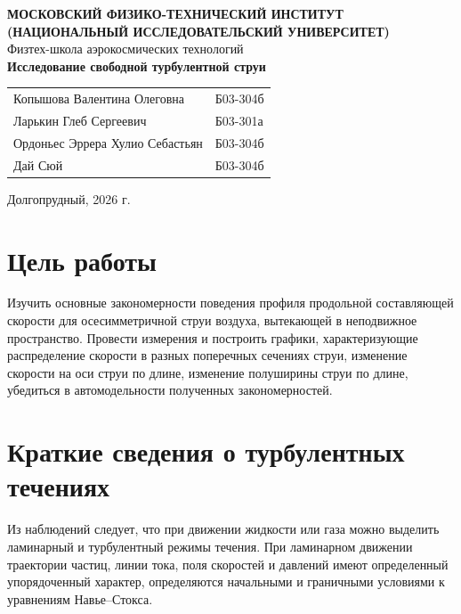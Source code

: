 \documentclass[12pt,a4paper]{article}
\begin{document}
\begin{titlepage}
    \begin{center}
        \textbf{МОСКОВСКИЙ ФИЗИКО-ТЕХНИЧЕСКИЙ ИНСТИТУТ} \\
        \textbf{(НАЦИОНАЛЬНЫЙ ИССЛЕДОВАТЕЛЬСКИЙ УНИВЕРСИТЕТ)}
        \\[1cm]

        
        {\large Физтех-школа аэрокосмических технологий}
        \\[3.5cm]

        {\Huge \textbf{Исследование свободной турбулентной струи}}
        \\[0.5cm]

        \begin{flushright}
            \begin{tabular}{l l}
                Копышова Валентина Олеговна & Б03-304б \\
                Ларькин Глеб Сергеевич & Б03-301а \\
                Ордоньес Эррера Хулио Себастьян & Б03-304б \\
                Дай Сюй                  & Б03-304б \\
            \end{tabular}
        \end{flushright}

        \vfill

        {\large Долгопрудный, 2026 г.}
    \end{center}
\end{titlepage}

\tableofcontents
\newpage

\section{Цель работы}
Изучить основные закономерности поведения профиля продольной составляющей скорости для осесимметричной струи воздуха, вытекающей в неподвижное пространство. Провести измерения и построить графики, характеризующие распределение скорости в разных поперечных сечениях струи, изменение скорости на оси струи по длине, изменение полуширины струи по длине, убедиться в автомодельности полученных закономерностей.


\section{Краткие сведения о турбулентных течениях}
Из наблюдений следует, что при движении жидкости или газа можно выделить ламинарный и турбулентный режимы течения. При ламинарном движении траектории частиц, линии тока, поля скоростей и давлений имеют определенный упорядоченный характер, определяются начальными и граничными условиями к уравнениям Навье–Стокса.
\end{document}
